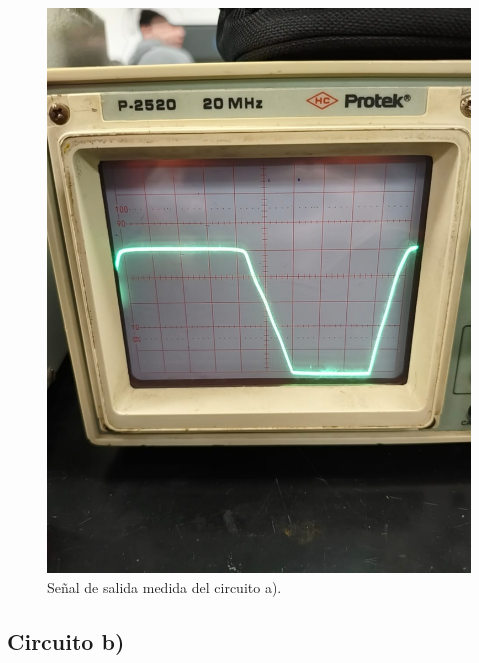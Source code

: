 \documentclass[chaptersright]{informeutn}
\begin{document}
\begin{figure}[H]
\begin{minipage}{0.46\textwidth}
    \includegraphics[width=\textwidth]{pictures/circuito_A_osciloscopio.jpeg}
    \caption{Señal de salida medida del circuito a).}
\end{minipage}
\end{figure}


\subsection*{Circuito b)}
\end{document}
